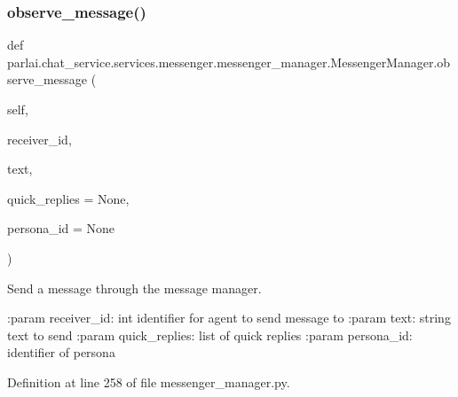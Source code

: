 \subsubsection{\texorpdfstring{observe\+\_\+message()}{observe\_message()}}
{\footnotesize\ttfamily def parlai.\+chat\+\_\+service.\+services.\+messenger.\+messenger\+\_\+manager.\+Messenger\+Manager.\+observe\+\_\+message (\begin{DoxyParamCaption}\item[{}]{self,  }\item[{}]{receiver\+\_\+id,  }\item[{}]{text,  }\item[{}]{quick\+\_\+replies = {\ttfamily None},  }\item[{}]{persona\+\_\+id = {\ttfamily None} }\end{DoxyParamCaption})}

\begin{DoxyVerb}Send a message through the message manager.

:param receiver_id:
    int identifier for agent to send message to
:param text:
    string text to send
:param quick_replies:
    list of quick replies
:param persona_id:
    identifier of persona
\end{DoxyVerb}
 

Definition at line 258 of file messenger\+\_\+manager.\+py.



